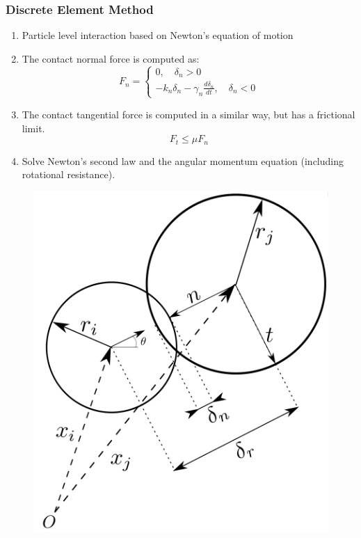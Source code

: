 \documentclass[notes]{beamer}
\begin{document}
\begin{frame}
\frametitle{Discrete Element Method}
\noindent
\fboxsep=0pt
\noindent
\begin{minipage}[t]{0.65\linewidth}
	\begin{enumerate}
		\item Particle level interaction based on
		Newton's equation of motion
		\item The contact normal force is
		computed as:
			\begin{equation*}
				F_n = %
				\begin{cases}
				0, \quad \delta_n > 0\\
				-k_n \delta_n - \gamma_n \frac{d \delta_n}{dt}, \quad \delta_n < 0
				\end{cases}
			\end{equation*}
		\item The contact tangential force is
		computed in a similar way, but
		has a frictional limit.
			\begin{equation*}
				F_t \le \mu F_n
			\end{equation*}
		\item Solve Newton's second law and
		the angular momentum equation
		(including rotational resistance).
	\end{enumerate}
	
\end{minipage}%
\hfill
\begin{minipage}[t]{0.35\linewidth}
	\begin{figure}
		\includegraphics[width=\textwidth]{figs/dem.png}
	\end{figure}
\end{minipage}	
\end{frame}
\end{document}
